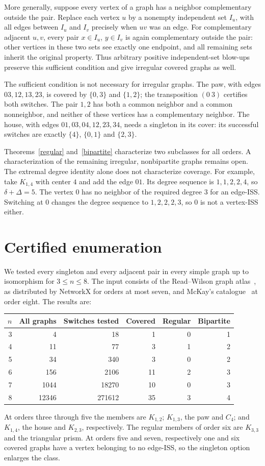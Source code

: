 \documentclass[11pt]{article}
\theoremstyle{definition}
\begin{document}
More generally, suppose every vertex of a graph has a neighbor
complementary outside the pair. Replace each vertex $u$ by a nonempty
independent set $I_u$, with all edges between $I_u$ and $I_v$ precisely
when $uv$ was an edge. For complementary adjacent $u,v$, every pair
$x\in I_u$, $y\in I_v$ is again complementary outside the pair:
other vertices in these two sets see exactly one endpoint, and all
remaining sets inherit the original property. Thus arbitrary positive
independent-set blow-ups preserve this sufficient condition and give
irregular covered graphs as well.

The sufficient condition is not necessary for irregular graphs. The paw,
with edges $03,12,13,23$, is covered by $\{0,3\}$ and $\{1,2\}$;
the transposition $(0\ 3)$ certifies both switches. The pair $1,2$ has
both a common neighbor and a common nonneighbor, and neither of these
vertices has a complementary neighbor. The house, with edges
$01,03,04,12,23,34$, needs a singleton in its cover: its successful
switches are exactly $\{4\}$, $\{0,1\}$ and $\{2,3\}$.

Theorems~\ref{regular} and~\ref{bipartite} characterize two subclasses
for all orders. A characterization of the remaining irregular,
nonbipartite graphs remains open. The extremal degree identity alone does not characterize coverage.
For example, take $K_{1,4}$ with center $4$ and add the edge $01$.
Its degree sequence is $1,1,2,2,4$, so $\delta+\Delta=5$.
The vertex $0$ has no neighbor of the required degree $3$ for an
edge-ISS. Switching at $0$ changes the degree sequence to $1,2,2,2,3$,
so $0$ is not a vertex-ISS either.

\section{Certified enumeration}
We tested every singleton and every adjacent pair in every simple graph
up to isomorphism for $3\leq n\leq8$. The input consists of the
Read--Wilson graph atlas~\cite{atlas}, as distributed by NetworkX for
orders at most seven, and McKay's catalogue~\cite{mckay} at order eight.
The results are:
\begin{center}
\begin{tabular}{rrrrrr}
\toprule
$n$ & All graphs & Switches tested & Covered & Regular & Bipartite\\
\midrule
3 & 4 & 18 & 1 & 0 & 1\\
4 & 11 & 77 & 3 & 1 & 2\\
5 & 34 & 340 & 3 & 0 & 2\\
6 & 156 & 2106 & 11 & 2 & 3\\
7 & 1044 & 18270 & 10 & 0 & 3\\
8 & 12346 & 271612 & 35 & 3 & 4\\
\bottomrule
\end{tabular}
\end{center}
At orders three through five the members are $K_{1,2}$;
$K_{1,3}$, the paw and $C_4$; and $K_{1,4}$, the house and $K_{2,3}$,
respectively. The regular members of order six are $K_{3,3}$ and the
triangular prism. At orders five and seven, respectively one and six
covered graphs have a vertex belonging to no edge-ISS, so the singleton
option enlarges the class.
\end{document}
